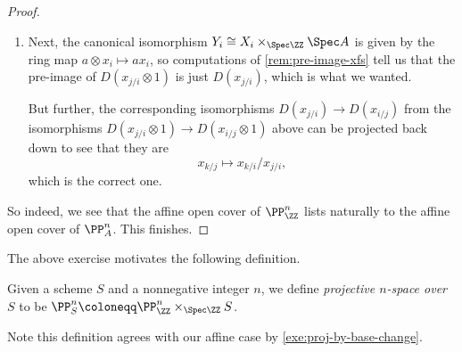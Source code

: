 \documentclass[../notes.tex]{subfiles}
\begin{document}
\begin{proof}
\begin{enumerate}
		\item Next, the canonical isomorphism $Y_i\cong X_i\times_{\Spec\ZZ}\Spec A$ is given by the ring map $a\otimes x_i\mapsto ax_i$, so computations of \autoref{rem:pre-image-xfs} tell us that the pre-image of $D(x_{j/i}\otimes1)$ is just $D(x_{j/i})$, which is what we wanted.

		But further, the corresponding isomorphisms $D(x_{j/i})\to D(x_{i/j})$ from the isomorphisms $D(x_{j/i}\otimes1)\to D(x_{i/j}\otimes1)$ above can be projected back down to see that they are
		\[x_{k/j}\mapsto x_{k/i}/x_{j/i},\]
		which is the correct one.
	\end{enumerate}
	So indeed, we see that the affine open cover of $\PP^n_\ZZ$ lists naturally to the affine open cover of $\PP^n_A$. This finishes.
\end{proof}
The above exercise motivates the following definition.
\begin{definition}
	Given a scheme $S$ and a nonnegative integer $n$, we define \textit{projective $n$-space over $S$} to be $\PP^n_S\coloneqq\PP^n_\ZZ\times_{\Spec\ZZ}S$.
\end{definition}
Note this definition agrees with our affine case by \autoref{exe:proj-by-base-change}.
\end{document}
